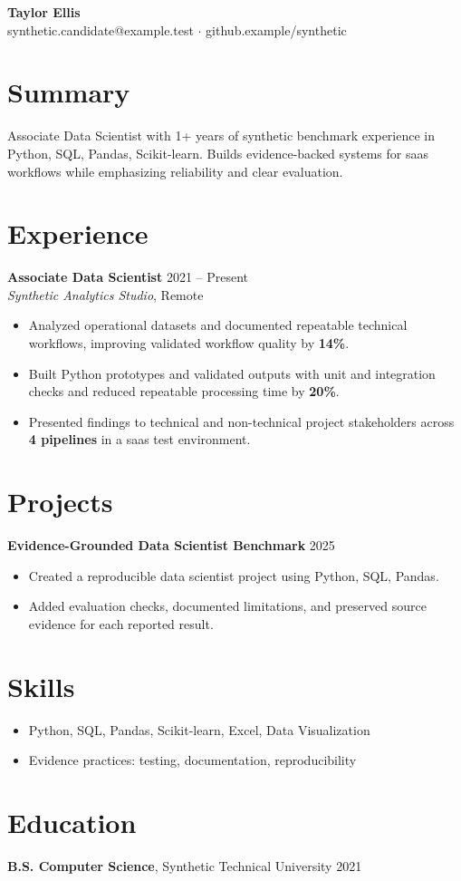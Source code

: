 \documentclass[10pt,letterpaper]{article}
\newcommand{\resumeItem}[1]{\item #1}
\newcommand{\resumeItemListStart}{\begin{itemize}[leftmargin=*]}
\newcommand{\resumeItemListEnd}{\end{itemize}}
\begin{document}
\begin{center}
{\Large \textbf{Taylor Ellis}}\\
synthetic.candidate@example.test $\cdot$ github.example/synthetic
\end{center}

\section*{Summary}
Associate Data Scientist with 1+ years of synthetic benchmark experience in Python, SQL, Pandas, Scikit-learn. Builds evidence-backed systems for saas workflows while emphasizing reliability and clear evaluation.

\section*{Experience}
\textbf{Associate Data Scientist} \hfill 2021 -- Present\\
\textit{Synthetic Analytics Studio}, Remote
\resumeItemListStart
  \resumeItem{Analyzed operational datasets and documented repeatable technical workflows, improving validated workflow quality by \textbf{14\%}.}
  \resumeItem{Built Python prototypes and validated outputs with unit and integration checks and reduced repeatable processing time by \textbf{20\%}.}
  \resumeItem{Presented findings to technical and non-technical project stakeholders across \textbf{4 pipelines} in a saas test environment.}
\resumeItemListEnd

\section*{Projects}
\textbf{Evidence-Grounded Data Scientist Benchmark} \hfill 2025
\resumeItemListStart
  \resumeItem{Created a reproducible data scientist project using Python, SQL, Pandas.}
  \resumeItem{Added evaluation checks, documented limitations, and preserved source evidence for each reported result.}
\resumeItemListEnd

\section*{Skills}
\resumeItemListStart
  \resumeItem{Python, SQL, Pandas, Scikit-learn, Excel, Data Visualization}
  \resumeItem{Evidence practices: testing, documentation, reproducibility}
\resumeItemListEnd

\section*{Education}
\textbf{B.S. Computer Science}, Synthetic Technical University \hfill 2021
\end{document}
